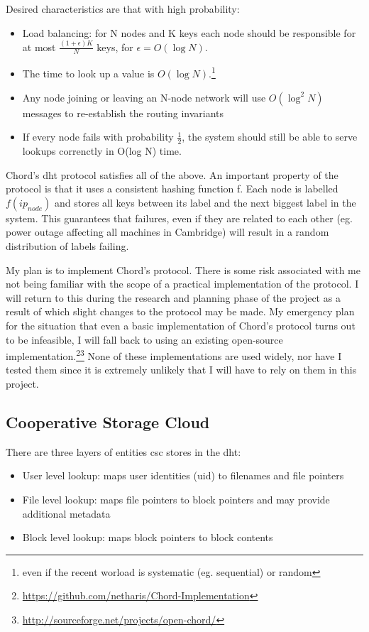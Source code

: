 \documentclass[12pt]{article}
\begin{document}
Desired characteristics are that with high probability:
\begin{itemize}
\item{Load balancing: for N nodes and K keys each node should be responsible for at most $\frac{(1+\epsilon)K}{N}$ keys, for $\epsilon=O(\log N)$.}
\item{The time to look up a value is $O(\log N)$.\footnote{even if the recent worload is systematic (eg. sequential) or random}}
\item{Any node joining or leaving an N-node network will use $O(\log^2 N)$ messages to re-establish the routing invariants}
\item{If every node fails with probability $\frac{1}{2}$, the system should still be able to serve lookups correnctly in O(log N) time.}
\end{itemize}

Chord's \gls{dht} protocol satisfies all of the above. \cite{chord} An important property of the protocol is that it uses a consistent hashing function f. Each node is labelled $f(ip_{node})$ and stores all keys between its label and the next biggest label in the system. This guarantees that failures, even if they are related to each other (eg. power outage affecting all machines in Cambridge) will result in a random distribution of labels failing.

My plan is to implement Chord's protocol. There is some risk associated with me not being familiar with the scope of a practical implementation of the protocol. I will return to this during the research and planning phase of the project as a result of which slight changes to the protocol may be made. My emergency plan for the situation that even a basic implementation of Chord's protocol turns out to be infeasible, I will fall back to using an existing open-source implementation.\footnote{\url{https://github.com/netharis/Chord-Implementation}}\footnote{\url{http://sourceforge.net/projects/open-chord/}} None of these implementations are used widely, nor have I tested them since it is extremely unlikely that I will have to rely on them in this project.

\subsection{Cooperative Storage Cloud}

There are three layers of entities \gls{csc} stores in the \gls{dht}:
\begin{itemize}
\item{User level lookup: maps user identities (\gls{uid}) to filenames and file pointers}
\item{File level lookup: maps file pointers to block pointers and may provide additional metadata}
\item{Block level lookup: maps block pointers to block contents}
\end{itemize}
\end{document}
